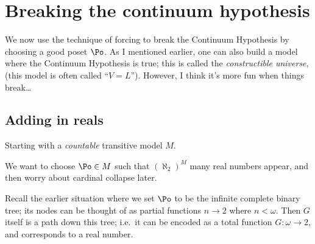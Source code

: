 \chapter{Breaking the continuum hypothesis}
We now use the technique of forcing to break the
Continuum Hypothesis by choosing a good poset $\Po$.
As I mentioned earlier, one can also build a model
where the Continuum Hypothesis is true;
this is called the \emph{constructible universe},
(this model is often called ``$V=L$'').
However, I think it's more fun when things break\dots

%
%

\section{Adding in reals}
Starting with a \emph{countable} transitive model $M$.

We want to choose $\Po \in M$ such that $(\aleph_2)^M$ many real numbers appear,
and then worry about cardinal collapse later.

Recall the earlier situation where we set $\Po$ to be the infinite complete binary tree; its nodes can be thought of as partial functions $n \to 2$ where $n < \omega$.
Then $G$ itself is a path down this tree; i.e.\ it can be encoded as a total function $G : \omega \to 2$,
and corresponds to a real number.

